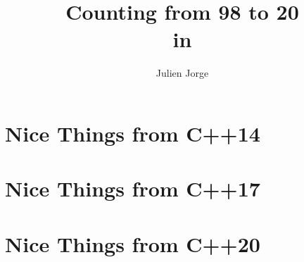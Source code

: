 \documentclass{book}
\title{Counting from 98 to 20 \\ in \Cpp{}}
\author{Julien Jorge}
\begin{document}
\frontmatter


\cleardoublepage
{}
\tableofcontents




\mainmatter



\chapter{Nice Things from C++14}
\chapter{Nice Things from C++17}
\chapter{Nice Things from C++20}




\appendix

\end{document}
